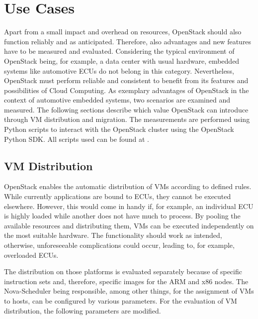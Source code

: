 \chapter{Use Cases}
\label{chapter:usecases}
    
    Apart from a small impact and overhead on resources, OpenStack should also function reliably and as anticipated.
    Therefore, also advantages and new features have to be measured and evaluated.
    Considering the typical environment of OpenStack being, for example, a data center with usual hardware, embedded systems like automotive \acp{ECU} do not belong in this category.
    Nevertheless, OpenStack must perform reliable and consistent to benefit from its features and possibilities of Cloud Computing.
    As exemplary advantages of OpenStack in the context of automotive embedded systems, two scenarios are examined and measured.
    The following sections describe which value OpenStack can introduce through \ac{VM} distribution and migration.
    The measurements are performed using Python scripts to interact with the OpenStack cluster using the OpenStack Python SDK.
    All scripts used can be found at \cite{Malinowski2021}.
    
    
    \section{VM Distribution}
    \label{section:distribution}
        
        OpenStack enables the automatic distribution of \acp{VM} according to defined rules.
        While currently applications are bound to \acp{ECU}, they cannot be executed elsewhere.
        However, this would come in handy if, for example, an individual \ac{ECU} is highly loaded while another does not have much to process.
        By pooling the available resources and distributing them, \acp{VM} can be executed independently on the most suitable hardware.
        The functionality should work as intended, otherwise, unforeseeable complications could occur, leading to, for example, overloaded \acp{ECU}.
        
        \noindent The distribution on those platforms is evaluated separately because of specific instruction sets and, therefore, specific images for the ARM and x86 nodes.
        The Nova-Scheduler being responsible, among other things, for the assignment of \acp{VM} to hosts, can be configured by various parameters.
        For the evaluation of \ac{VM} distribution, the following parameters are modified.
        
